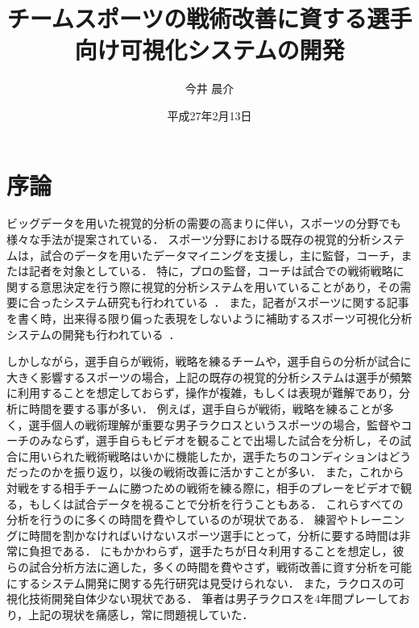 \documentclass[sotsuron]{kuee}
\title{チームスポーツの戦術改善に資する選手向け可視化システムの開発}
\author{今井 晨介}
\date{平成27年2月13日}
\begin{document}
\maketitle
\tableofcontents


\chapter{序論}
	ビッグデータを用いた視覚的分析の需要の高まりに伴い，スポーツの分野でも様々な手法が提案されている．
	スポーツ分野における既存の視覚的分析システムは，試合のデータを用いたデータマイニングを支援し，主に監督，コーチ，または記者を対象としている．
	特に，プロの監督，コーチは試合での戦術戦略に関する意思決定を行う際に視覚的分析システムを用いていることがあり，その需要に合ったシステム研究も行われている~\cite{SoccerStory,SnapShot,TenniVis}．
	また，記者がスポーツに関する記事を書く時，出来得る限り偏った表現をしないように補助するスポーツ可視化分析システムの開発も行われている~\cite{SoccerStory}．
	
	しかしながら，選手自らが戦術，戦略を練るチームや，選手自らの分析が試合に大きく影響するスポーツの場合，上記の既存の視覚的分析システムは選手が頻繁に利用することを想定しておらず，操作が複雑，もしくは表現が難解であり，分析に時間を要する事が多い．
	例えば，選手自らが戦術，戦略を練ることが多く，選手個人の戦術理解が重要な男子ラクロスというスポーツの場合，監督やコーチのみならず，選手自らもビデオを観ることで出場した試合を分析し，その試合に用いられた戦術戦略はいかに機能したか，選手たちのコンディションはどうだったのかを振り返り，以後の戦術改善に活かすことが多い．
	また，これから対戦をする相手チームに勝つための戦術を練る際に，相手のプレーをビデオで観る，もしくは試合データを視ることで分析を行うこともある．
	これらすべての分析を行うのに多くの時間を費やしているのが現状である．
	練習やトレーニングに時間を割かなければいけないスポーツ選手にとって，分析に要する時間は非常に負担である．
	にもかかわらず，選手たちが日々利用することを想定し，彼らの試合分析方法に適した，多くの時間を費やさず，戦術改善に資す分析を可能にするシステム開発に関する先行研究は見受けられない．
	また，ラクロスの可視化技術開発自体少ない現状である．
	筆者は男子ラクロスを4年間プレーしており，上記の現状を痛感し，常に問題視していた．
	
\end{document}
